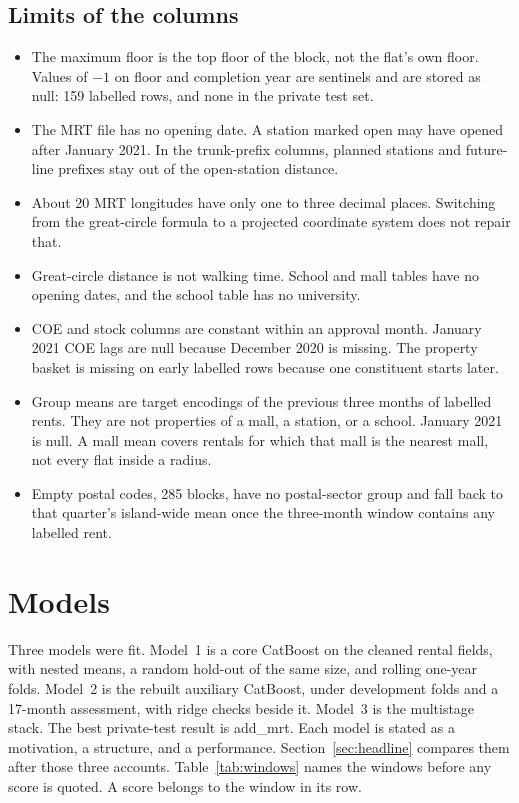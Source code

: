 \documentclass[11pt,a4paper]{article}
\begin{document}
\subsection{Limits of the columns}
\label{sec:collimits}

\begin{itemize}
\item The maximum floor is the top floor of the block, not the flat's own floor.
Values of \(-1\) on floor and completion year are sentinels and are stored as null: 159 labelled rows, and none in the private test set.
\item The MRT file has no opening date.
A station marked open may have opened after January 2021.
In the trunk-prefix columns, planned stations and future-line prefixes stay out of the open-station distance.
\item About 20 MRT longitudes have only one to three decimal places.
Switching from the great-circle formula to a projected coordinate system does not repair that.
\item Great-circle distance is not walking time.
School and mall tables have no opening dates, and the school table has no university.
\item COE and stock columns are constant within an approval month.
January 2021 COE lags are null because December 2020 is missing.
The property basket is missing on early labelled rows because one constituent starts later.
\item Group means are target encodings of the previous three months of labelled rents.
They are not properties of a mall, a station, or a school.
January 2021 is null.
A mall mean covers rentals for which that mall is the nearest mall, not every flat inside a radius.
\item Empty postal codes, 285 blocks, have no postal-sector group and fall back to that quarter's island-wide mean once the three-month window contains any labelled rent.
\end{itemize}

\FloatBarrier
\section{Models}
\label{sec:models}

Three models were fit.
Model~1 is a core CatBoost on the cleaned rental fields, with nested means, a random hold-out of the same size, and rolling one-year folds.
Model~2 is the rebuilt auxiliary CatBoost, under development folds and a 17-month assessment, with ridge checks beside it.
Model~3 is the multistage stack.
The best private-test result is add\_mrt.
Each model is stated as a motivation, a structure, and a performance.
Section~\ref{sec:headline} compares them after those three accounts.
Table~\ref{tab:windows} names the windows before any score is quoted.
A score belongs to the window in its row.
\end{document}
